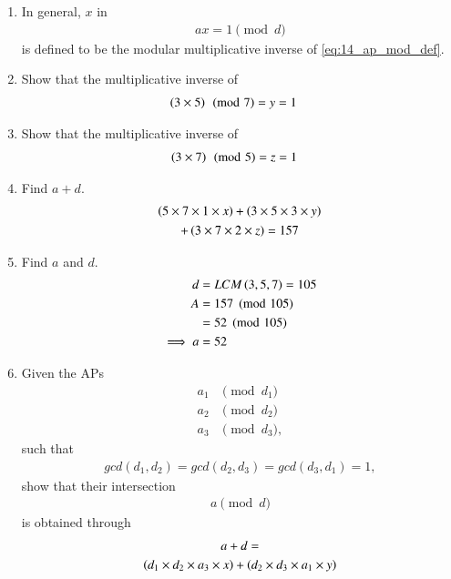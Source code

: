 \documentclass[journal,12pt,twocolumn]{IEEEtran}
\renewcommand\thesection{\arabic{section}}
\begin{document}
\begin{enumerate}[label=\thesection.\arabic*
,ref=\thesection.\theenumi]
\begin{enumerate}[label=\thesection.\arabic*
,ref=\thesection.\theenumi]
\item In general, $x$ in 
\begin{align}
\label{eq:14_ap_mod_inv_def}
ax =1\pmod{d}
\end{align}
%
is defined to be the modular multiplicative inverse of \eqref{eq:14_ap_mod_def}.
\item Show that the multiplicative inverse of 
\begin{align}
\label{eq:14_ap_mod_357_sol}
\left(3\times 5\right)\pmod{7} &= y=1
\end{align}
%
\item Show that the multiplicative inverse of 
\begin{align}
\label{eq:14_ap_mod_375_sol}
\left(3\times 7\right)\pmod{5} &= z=1
\end{align}
%
\item Find $a+d$.
\\
\solution 
\begin{multline}
\label{eq:14_ap_mod_ad_sol}
\left(5\times 7 \times 1 \times x\right)+
\left(3\times 5\times 3 \times y\right) 
\\
+
\left(3\times 7\times 2 \times z\right) =  157
\end{multline}
%
\item Find $a$ and $d$.
\\
\solution
\begin{align}
\label{eq:14_ap_mod_d}
d &= LCM\left(3,5,7\right) = 105
\\
A&=157 \pmod{105} 
\nonumber \\
&= 52\pmod{105} 
\nonumber \\
\implies a &= 52
\end{align}
\item Given the APs 
\begin{align}
\label{eq:14_ap_mod_gen}
a_1&\pmod{d_1}
\\
a_2 &\pmod {d_2}
\\
a_3 &\pmod {d_3},
\end{align}
%
such that 
\begin{align}
gcd(d_1,d_2)=gcd(d_2,d_3)=gcd(d_3,d_1)=1,
\end{align}
show that their intersection
\begin{align}
\label{eq:14_ap_mod_gen_int}
a\pmod{d}
\end{align}
%
is obtained through
\begin{multline}
\label{eq:14_ap_mod_ad_gen}
a+d =
\\
 \brak{d_1\times d_2 \times a_3 \times x}+
\brak{d_2\times d_3 \times a_1 \times y}
\\

\end{multline}
\end{enumerate}
\end{enumerate}
\end{document}
